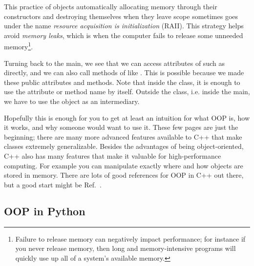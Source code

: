 \begin{code*}
\caption{An example main showcasing scopes in C++. Here,
Tallulah-Paige is in her own scope, set aside by
curly brackets. By line 44, we have left the scope with
Tallulah-Paige in it, and she is ruthlessly and
automatically exterminated by her destructor.}
\label{lst:scope}
\end{code*}
\begin{code*}
\caption{Output for the main code of \\listref{lst:scope}.
We see that Tallulah-Paige perishes before Ziggy is instantiated.}
\label{lst:scopeOut}
\end{code*}

This practice of objects automatically allocating memory through their
constructors and destroying themselves when they leave scope
sometimes goes under the name
{\it resource acquisition is initialization} (RAII).
This strategy helps avoid {\it memory leaks},
which is when the computer fails to release some unneeded 
memory\footnote{Failure to release memory can negatively impact performance;
for instance if you never release memory, then long and memory-intensive
programs will quickly use up all of a system's available memory.}.

Turning back to the main, we see that we can access attributes of
 such as  directly, and we can also call
methods of  like . This is possible because
we made these public attributes and methods. Note that inside the class,
it is enough to use the attribute or method name by itself. Outside the
class, i.e. inside the main, we have to use the object as an 
intermediary.

Hopefully this is enough for you to get at least an intuition for
what OOP is, how it works, and why someone would want to use it. These
few pages are just the beginning; there are many more advanced
features available to C++ that make classes extremely generalizable.
Besides the advantages of being object-oriented, C++ also has many
features that make it valuable for high-performance computing.
For example you can manipulate exactly where and how objects
are stored in memory. There are lots of good references for OOP
in C++ out there, but a good start might be Ref.~\cite{tp:cpp}.\\

\subsection{OOP in Python}

